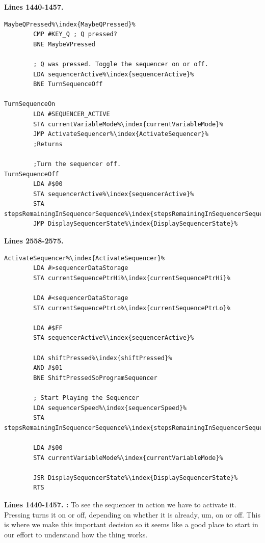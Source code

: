 \clearpage
{}
\textbf{Lines 1440-1457. }
\begin{lstlisting}[escapechar=\%]
MaybeQPressed%\index{MaybeQPressed}%    
        CMP #KEY_Q ; Q pressed?
        BNE MaybeVPressed

        ; Q was pressed. Toggle the sequencer on or off.
        LDA sequencerActive%\index{sequencerActive}%
        BNE TurnSequenceOff

TurnSequenceOn
        LDA #SEQUENCER_ACTIVE
        STA currentVariableMode%\index{currentVariableMode}%
        JMP ActivateSequencer%\index{ActivateSequencer}%
        ;Returns

        ;Turn the sequencer off.
TurnSequenceOff   
        LDA #$00
        STA sequencerActive%\index{sequencerActive}%
        STA stepsRemainingInSequencerSequence%\index{stepsRemainingInSequencerSequence}%
        JMP DisplaySequencerState%\index{DisplaySequencerState}%
\end{lstlisting}
\textbf{Lines 2558-2575. }
\begin{lstlisting}[escapechar=\%]
ActivateSequencer%\index{ActivateSequencer}% 
        LDA #>sequencerDataStorage
        STA currentSequencePtrHi%\index{currentSequencePtrHi}%

        LDA #<sequencerDataStorage
        STA currentSequencePtrLo%\index{currentSequencePtrLo}%

        LDA #$FF
        STA sequencerActive%\index{sequencerActive}%

        LDA shiftPressed%\index{shiftPressed}%
        AND #$01
        BNE ShiftPressedSoProgramSequencer

        ; Start Playing the Sequencer
        LDA sequencerSpeed%\index{sequencerSpeed}%
        STA stepsRemainingInSequencerSequence%\index{stepsRemainingInSequencerSequence}%

        LDA #$00
        STA currentVariableMode%\index{currentVariableMode}%

        JSR DisplaySequencerState%\index{DisplaySequencerState}%
        RTS 
\end{lstlisting}
\clearpage

\textbf{Lines 1440-1457. :} To see the sequencer in action we have to activate it. Pressing  turns it on or off, depending on whether
it is already, um, on or off. This is where we make this important decision so it seems like a good place to start in our effort to understand how the thing works.


